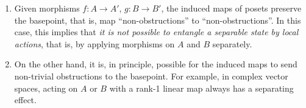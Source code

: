 \begin{enumerate}
    \item Given morphisms $f\colon A \to A'$, $g\colon B \to B'$, the induced maps of posets preserve the basepoint, that is, map ``non-obstructions'' to ``non-obstructions''.
    In this case, this implies that \emph{it is not possible to entangle a separable state by local actions}, that is, by applying morphisms on $A$ and $B$ separately.
    \item On the other hand, it is, in principle, possible for the induced maps to send non-trivial obstructions to the basepoint.
    For example, in complex vector spaces, acting on $A$ or $B$ with a rank-1 linear map always has a separating effect.
\end{enumerate}
